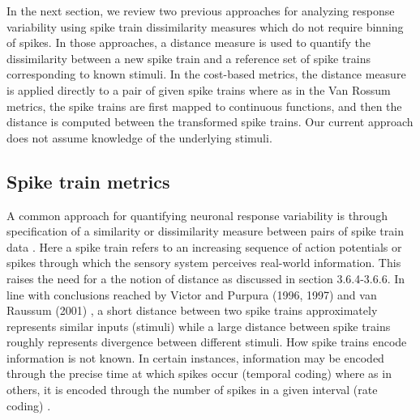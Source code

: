 
In the next section, we review two previous approaches for analyzing response variability using spike train dissimilarity measures which do not require binning
of spikes. In those approaches, a distance measure is used to quantify the dissimilarity between a new spike train and a reference set of spike trains
corresponding to known stimuli. In the cost-based metrics,
the distance measure is applied directly to a pair of given spike trains where as in the Van Rossum metrics, the spike trains are first mapped to continuous functions, and then the distance is computed between the transformed spike trains. Our current approach does not assume knowledge of the underlying stimuli.

\subsection{Spike train metrics}
A common approach for quantifying neuronal response variability is through specification of a  similarity or dissimilarity measure between pairs of spike train data \cite{Brown2004, Victor1996, Victor1998,Rossum2001,houghton2010measuring}.
Here a spike train refers to an increasing sequence of action potentials or spikes through which the sensory system perceives real-world information.
This raises the need for a the notion of distance as discussed in section 3.6.4-3.6.6.  In line with conclusions reached by Victor and Purpura (1996, 1997) and van Raussum (2001) \cite{Victor1996, Victor1998, Rossum2001}, a short distance between two spike trains approximately represents similar inputs (stimuli) while a large distance between spike trains roughly represents divergence between different stimuli.
How spike trains encode information is not known. In certain instances, information may be encoded through the precise time at which spikes occur (temporal coding) where as in others, it is encoded through the number of spikes in a given interval (rate coding) \cite{Abbott2001}.
